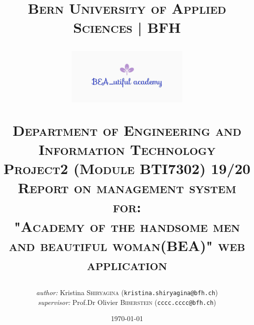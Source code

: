 \documentclass{scrartcl}
\begin{document}
\begin{titlepage}


\title{\textsc{\LARGE Bern University of Applied Sciences | BFH }\\[1cm]
\begin{center}
\includegraphics[width = 60mm]{bea_logo.JPG}
\end{center}
\textsc{\small Department of Engineering and Information Technology}\\
\textsc{\small Project2 (Module BTI7302) 19/20}\\[1cm]
\textsc{\small Report on management system for: }\\
\textsc{"Academy of the handsome men and beautiful woman(BEA)" web application}}
\date{\today}   %
\author{\textit{author: }Kristina \textsc{Shiryagina} (\texttt{kristina.shiryagina@bfh.ch}) \\
 \textit{supervisor: } Prof.Dr Olivier  \textsc{Biberstein}  (\texttt{cccc.cccc@bfh.ch})\\
 }
\maketitle	
	
\tableofcontents
\clearpage
\end{titlepage}
\end{document}
